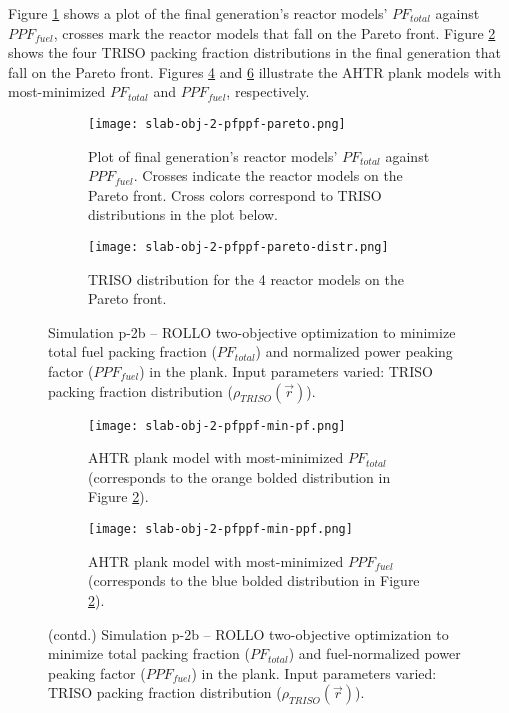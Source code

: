 Figure \ref{fig:slab-obj-2-pfppf-pareto} shows a plot of the final generation's reactor 
models' $PF_{total}$ against $PPF_{fuel}$, crosses mark the reactor models that fall on 
the Pareto front.
Figure \ref{fig:slab-obj-2-pfppf-pareto-distr} shows the four TRISO packing fraction 
distributions in the final generation that fall on the Pareto front. 
Figures \ref{fig:slab-obj-2-pfppf-min-pf} and \ref{fig:slab-obj-2-pfppf-min-ppf} 
illustrate the \gls{AHTR} plank models with most-minimized $PF_{total}$ and 
$PPF_{fuel}$, respectively. 
\begin{figure}[H]
    \centering
    \begin{subfigure}{\textwidth}
        \texttt{[image: slab-obj-2-pfppf-pareto.png]}
        \caption{Plot of final generation's reactor models' $PF_{total}$ against 
        $PPF_{fuel}$. 
        Crosses indicate the reactor models on the Pareto front. Cross colors correspond  
        to TRISO distributions in the plot below.}
        \label{fig:slab-obj-2-pfppf-pareto} 
    \end{subfigure}
    \begin{subfigure}{\textwidth}
        \texttt{[image: slab-obj-2-pfppf-pareto-distr.png]}
        \caption{TRISO distribution for the 4 reactor models on the Pareto front.}
        \label{fig:slab-obj-2-pfppf-pareto-distr} 
    \end{subfigure}
    \caption{Simulation p-2b -- ROLLO two-objective optimization to minimize total fuel 
    packing fraction ($PF_{total}$) and normalized power peaking factor ($PPF_{fuel}$) 
    in the plank. 
    Input parameters varied: TRISO packing fraction distribution 
    ($\rho_{TRISO}(\vec{r})$).}
    \label{fig:slab-obj-2-pfppf}
\end{figure}
\begin{figure}[H]
    \ContinuedFloat
    \begin{subfigure}{\textwidth}
        \texttt{[image: slab-obj-2-pfppf-min-pf.png]}
        \caption{\gls{AHTR} plank model with most-minimized $PF_{total}$
        (corresponds to the orange bolded distribution in Figure 
        \ref{fig:slab-obj-2-pfppf-pareto-distr}).}
        \label{fig:slab-obj-2-pfppf-min-pf} 
    \end{subfigure}
    \begin{subfigure}{\textwidth}
        \texttt{[image: slab-obj-2-pfppf-min-ppf.png]}
        \caption{\gls{AHTR} plank model with most-minimized $PPF_{fuel}$
        (corresponds to the blue bolded distribution in Figure 
        \ref{fig:slab-obj-2-pfppf-pareto-distr}).}
        \label{fig:slab-obj-2-pfppf-min-ppf} 
    \end{subfigure}
    \caption{(contd.) Simulation p-2b -- ROLLO two-objective optimization to minimize 
    total packing fraction ($PF_{total}$) and fuel-normalized power peaking factor 
    ($PPF_{fuel}$) in the plank. 
    Input parameters varied: TRISO packing fraction distribution ($\rho_{TRISO}(\vec{r})$).}
\end{figure}

